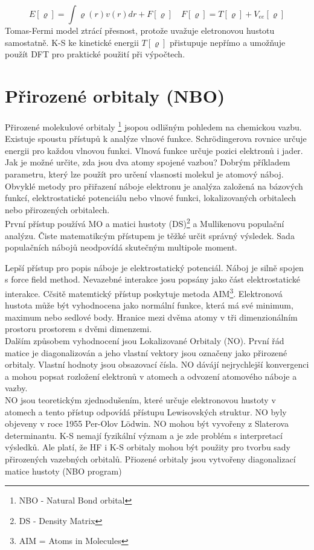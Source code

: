 \documentclass[
  digital, %
  table,   %
  lof,     %
  lot,     %
]{fithesis3}
\begin{document}
\begin{equation}
  E[\varrho] = \int \varrho(r)v(r)dr + F[\varrho] \quad F[\varrho] = T[\varrho] + V_{ee}[\varrho]
\end{equation}
Tomas-Fermi model ztrácí přesnost, protože uvažuje eletronovou hustotu samostatně. K-S ke kinetické energii  $T[\varrho]$ přistupuje nepřímo a umožňuje použít DFT pro praktické použití při výpočtech. \cite{parr1994density}

\section{Přirozené orbitaly (NBO)}
Přirozené molekulové orbitaly \footnote{NBO - Natural Bond orbital} jsopou odlišným pohledem na chemickou vazbu. Existuje spoustu přístupů k analýze vlnové funkce. Schrödingerova rovnice určuje energii pro každou vlnovou funkci. Vlnová funkce určuje pozici elektronů i jader. Jak je možné určite, zda jsou dva atomy spojené vazbou? Dobrým příkladem parametru, který lze použít pro určení vlasnosti molekul je atomový náboj. Obvyklé metody pro přiřazení náboje elektronu je analýza založená na bázových funkcí, elektrostatické potenciálu nebo vlnové funkci, lokalizovaných orbitalech nebo přirozených orbitalech. \\
První přístup používá MO a matici hustoty (DS)\footnote{DS - Density Matrix} a Mullikenovu populační analýzu. Čiste matematikcým přístupem je těžké určit správný výsledek. Sada populačních nábojů neodpovídá skutečným multipole moment.

Lepší přístup pro popis náboje je elektrostatický potenciál. Náboj je silně spojen s force field method. Nevazebné interakce josu popsány jako část elektrostatické interakce. Cčsitě matemtický přístup poskytuje metoda AIM\footnote{AIM = Atoms in Molecules}. Elektronová hustota může být vyhodnocena jako normální funkce, která má své minimum, maximum nebo sedlové body. Hranice mezi dvěma atomy v tři dimenzionálním prostoru prostorem s dvěmi dimenzemi. \\
Dalším způsobem vyhodnocení jsou Lokalizované Orbitaly (NO).  První řád matice je diagonalizován a jeho vlastní vektory jsou označeny jako přirozené orbitaly. Vlastní hodnoty jsou obsazovací čísla. NO dávájí nejrychlejší konvergenci a mohou popsat rozložení elektronů v atomech a odvození atomového náboje a vazby.  \cite{jensen2007introduction} \\
 NO jsou teoretickým zjednodušením, které určuje elektronovou hustoty v atomech a  tento přístup odpovídá přístupu Lewisovských struktur. NO byly objeveny v roce 1955 Per-Olov Lödwin. NO mohou být vyvořeny z Slaterova determinantu. K-S nemají fyzikální význam a je zde problém s interpretací výsledků. Ale platí, že HF i K-S orbitaly mohou být použity pro tvorbu sady přirozených vazebných orbitalů. Přiozené orbitaly jsou vytvořeny diagonalizací matice hustoty
(NBO program)
\end{document}
